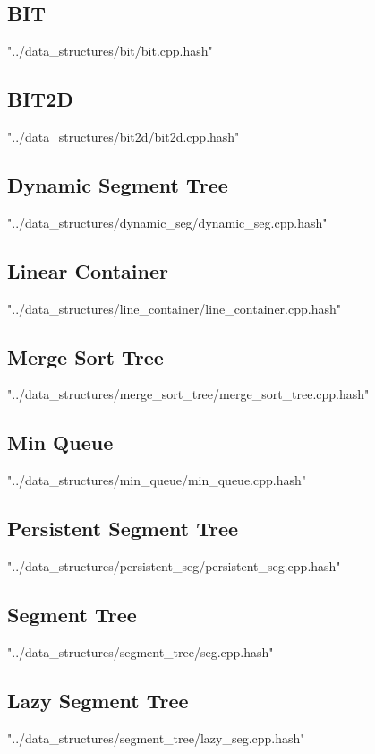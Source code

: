 \documentclass [5pt,twocolumn,oneside]{article}
\begin{document}
\begin{landscape}
\begin{multicols}{3}
\subsection{ BIT}
 {"../data_structures/bit/bit.cpp.hash"}


\subsection{ BIT2D}
 {"../data_structures/bit2d/bit2d.cpp.hash"}


\subsection{ Dynamic Segment Tree}
 {"../data_structures/dynamic_seg/dynamic_seg.cpp.hash"}


\subsection{ Linear Container}
 {"../data_structures/line_container/line_container.cpp.hash"}


\subsection{ Merge Sort Tree}
 {"../data_structures/merge_sort_tree/merge_sort_tree.cpp.hash"}


\subsection{ Min Queue}
 {"../data_structures/min_queue/min_queue.cpp.hash"}


\subsection{ Persistent Segment Tree}
 {"../data_structures/persistent_seg/persistent_seg.cpp.hash"}


\subsection{ Segment Tree}
 {"../data_structures/segment_tree/seg.cpp.hash"}


\subsection{ Lazy Segment Tree}
 {"../data_structures/segment_tree/lazy_seg.cpp.hash"}



\end{multicols}
\end{landscape}
\end{document}
